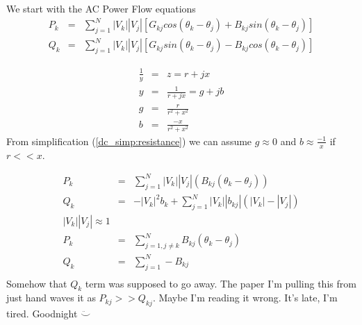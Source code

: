 We start with the AC Power Flow equations
\begin{eqnarray}
P_k &=& \sum_{j=1}^N|V_k||V_j|[G_{kj}cos(\theta_k-\theta_j)+B_{kj}sin(\theta_k-\theta_j)] \\
Q_k &=& \sum_{j=1}^N|V_k||V_j|[G_{kj}sin(\theta_k-\theta_j)-B_{kj}cos(\theta_k-\theta_j)]
\end{eqnarray}

\begin{eqnarray}
\frac{1}{y} &=& z =r+jx \\
y &=& \frac{1}{r+jx} = g+jb \\
g &=& \frac{r}{r^2+x^2} \\
b &=& \frac{-x}{r^2+x^2}
\end{eqnarray}
From simplification (\ref{dc_simp:resistance}) we can assume $g \approx 0$ and $b \approx \frac{-1}{x}$ if $r << x$.

\begin{eqnarray}
P_k &=& \sum_{j=1}^N|V_k||V_j|(B_{kj}(\theta_k-\theta_j)) \\
Q_k &=& -|V_k|^2b_k+\sum_{j=1}^N|V_k||b_{kj}|(|V_k|-|V_j|) \\
|V_k||V_j| \approx 1 \\
P_k &=& \sum_{j=1, j \neq k}^NB_{kj}(\theta_k - \theta_j) \\
Q_k &=& \sum_{j=1}^N -B_{kj} \\
\end{eqnarray}
Somehow that $Q_k$ term was supposed to go away. The paper I'm pulling this from just hand waves it as $P_{kj} >> Q_{kj}$. Maybe I'm reading it wrong. It's late, I'm tired. Goodnight $\ddot\smile$

